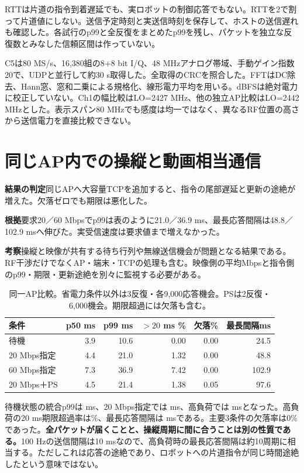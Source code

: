 \documentclass[a4paper,10pt]{ltjsarticle}
\begin{document}
RTTは片道の指令到着遅延でも、実ロボットの制御応答でもない。RTTを2で割って片道値にしない。送信予定時刻と実送信時刻を保存して、ホストの送信遅れも確認した。各試行のp99と全反復をまとめたp99を残し、パケットを独立な反復数とみなした信頼区間は作っていない。

C5は80 MS/s、16,380組の8+8 bit I/Q、48 MHzアナログ帯域、手動ゲイン指数20で、UDPと並行して約30 s取得した。全取得のCRCを照合した。FFTはDC除去、Hann窓、窓和二乗による規格化、線形電力平均を用いる。dBFSは絶対電力に校正していない。Ch1の幅比較はLO=2427 MHz、他の独立AP比較はLO=2442 MHzとした。表示スパン80 MHzでも感度は均一ではなく、異なるRF位置の高さから送信電力を直接比較できない。

\section{同じAP内での操縦と動画相当通信}
\par\smallskip\noindent\textbf{結果の判定}\quad 同じAPへ大容量TCPを追加すると、指令の尾部遅延と更新の途絶が増えた。欠落ゼロでも期限は悪化した。

\noindent\textbf{根拠}\quad 要求20／60 Mbpsでp99は表のように21.0／36.9 ms、最長応答間隔は48.8／102.9 msへ伸びた。実受信速度は要求値まで増えなかった。

\noindent\textbf{考察}\quad 操縦と映像が共有する待ち行列や無線送信機会が問題となる結果である。RF干渉だけでなくAP・端末・TCPの処理も含む。映像側の平均Mbpsと指令側のp99・期限・更新途絶を別々に監視する必要がある。

\begin{table}[htbp]\centering\small\caption{同一AP比較。省電力条件以外は3反復・各9,000応答機会。PSは2反復・6,000機会。期限超過には欠落も含む。}\begin{tabular}{lrrrrr}\toprule
条件 & p50 ms & p99 ms & $>20$ ms \% & 欠落\% & 最長間隔ms\\\midrule
待機 & 3.9 & 10.6 & 0.00 & 0.00 & 24.5\\
20 Mbps指定 & 4.4 & 21.0 & 1.32 & 0.00 & 48.8\\
60 Mbps指定 & 7.3 & 36.9 & 7.42 & 0.00 & 102.9\\
20 Mbps＋PS & 4.5 & 21.4 & 1.38 & 0.05 & 97.6\\
\bottomrule\end{tabular}\end{table}

待機状態の統合p99は\SameIdlePninetyNine{} ms、20 Mbps指定では\SameTwentyPninetyNine{} ms、高負荷では\SameHighPninetyNine{} msとなった。高負荷の20 ms期限超過率は\SameHighDeadline{}\%、最長応答間隔は\SameHighGap{} msである。主要3条件の欠落率は0\%であった。\textbf{全パケットが届くことと、操縦周期に間に合うことは別の性質である。}100 Hzの送信間隔は10 msなので、高負荷時の最長応答間隔は約10周期に相当する。ただしこれは応答の途絶であり、ロボットへの片道指令が同じ時間途絶したという意味ではない。
\end{document}
